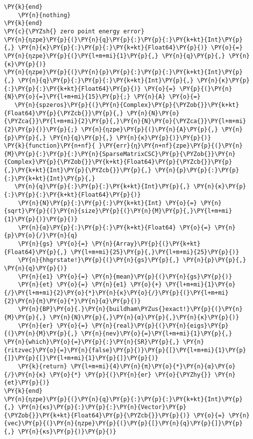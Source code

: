 \begin{Verbatim}[commandchars=\\\{\}]
    \PY{k}{end}
    \PY{n}{nothing}
\PY{k}{end}
\PY{c}{\PYZsh{} zero point energy error}
\PY{n}{ηzpe}\PY{p}{(}\PY{n}{q}\PY{p}{:}\PY{p}{:}\PY{k+kt}{Int}\PY{p}{,} \PY{n}{κ}\PY{p}{:}\PY{p}{:}\PY{k+kt}{Float64}\PY{p}{)} \PY{o}{=} \PY{n}{ηzpe}\PY{p}{(}\PY{l+m+mi}{1}\PY{p}{,} \PY{n}{q}\PY{p}{,} \PY{n}{κ}\PY{p}{)}
\PY{n}{ηzpe}\PY{p}{(}\PY{n}{p}\PY{p}{:}\PY{p}{:}\PY{k+kt}{Int}\PY{p}{,} \PY{n}{q}\PY{p}{:}\PY{p}{:}\PY{k+kt}{Int}\PY{p}{,} \PY{n}{κ}\PY{p}{:}\PY{p}{:}\PY{k+kt}{Float64}\PY{p}{)} \PY{o}{=} \PY{p}{(}\PY{n}{N}\PY{o}{=}\PY{l+m+mi}{15}\PY{p}{;} \PY{n}{A} \PY{o}{=}
   \PY{n}{spzeros}\PY{p}{(}\PY{n}{Complex}\PY{p}{\PYZob{}}\PY{k+kt}{Float64}\PY{p}{\PYZcb{}}\PY{p}{,} \PY{n}{N}\PY{o}{\PYZca{}}\PY{l+m+mi}{2}\PY{p}{,}\PY{n}{N}\PY{o}{\PYZca{}}\PY{l+m+mi}{2}\PY{p}{)}\PY{p}{;} \PY{n}{ηzpe}\PY{p}{(}\PY{n}{A}\PY{p}{,} \PY{n}{p}\PY{p}{,} \PY{n}{q}\PY{p}{,} \PY{n}{κ}\PY{p}{)}\PY{p}{)}
\PY{k}{function}\PY{n+nf}{ }\PY{err}{η}\PY{n+nf}{zpe}\PY{p}{(}\PY{n}{M}\PY{p}{:}\PY{p}{:}\PY{n}{SparseMatrixCSC}\PY{p}{\PYZob{}}\PY{n}{Complex}\PY{p}{\PYZob{}}\PY{k+kt}{Float64}\PY{p}{\PYZcb{}}\PY{p}{,}\PY{k+kt}{Int}\PY{p}{\PYZcb{}}\PY{p}{,} \PY{n}{p}\PY{p}{:}\PY{p}{:}\PY{k+kt}{Int}\PY{p}{,}
   \PY{n}{q}\PY{p}{:}\PY{p}{:}\PY{k+kt}{Int}\PY{p}{,} \PY{n}{κ}\PY{p}{:}\PY{p}{:}\PY{k+kt}{Float64}\PY{p}{)}
    \PY{n}{N}\PY{p}{:}\PY{p}{:}\PY{k+kt}{Int} \PY{o}{=} \PY{n}{sqrt}\PY{p}{(}\PY{n}{size}\PY{p}{(}\PY{n}{M}\PY{p}{,}\PY{l+m+mi}{1}\PY{p}{)}\PY{p}{)}
    \PY{n}{α}\PY{p}{:}\PY{p}{:}\PY{k+kt}{Float64} \PY{o}{=} \PY{n}{p}\PY{o}{/}\PY{n}{q}
    \PY{n}{gs} \PY{o}{=} \PY{n}{Array}\PY{p}{(}\PY{k+kt}{Float64}\PY{p}{,} \PY{l+m+mi}{25}\PY{p}{,}\PY{l+m+mi}{25}\PY{p}{)}
    \PY{n}{hhgrstate!}\PY{p}{(}\PY{n}{gs}\PY{p}{,} \PY{n}{p}\PY{p}{,} \PY{n}{q}\PY{p}{)}
    \PY{n}{e1} \PY{o}{=} \PY{n}{mean}\PY{p}{(}\PY{n}{gs}\PY{p}{)}
    \PY{n}{et} \PY{o}{=} \PY{n}{e1} \PY{o}{+} \PY{l+m+mi}{1}\PY{o}{/}\PY{l+m+mi}{2}\PY{o}{*}\PY{n}{κ}\PY{o}{/}\PY{p}{(}\PY{l+m+mi}{2}\PY{n}{π}\PY{o}{*}\PY{n}{α}\PY{p}{)}
    \PY{n}{BP}\PY{o}{.}\PY{n}{buildham\PYZus{}exact!}\PY{p}{(}\PY{n}{M}\PY{p}{,} \PY{n}{N}\PY{p}{,}\PY{n}{α}\PY{p}{,}\PY{n}{κ}\PY{p}{)}
    \PY{n}{er} \PY{o}{=} \PY{n}{real}\PY{p}{(}\PY{n}{eigs}\PY{p}{(}\PY{n}{M}\PY{p}{,} \PY{n}{nev}\PY{o}{=}\PY{l+m+mi}{1}\PY{p}{,} \PY{n}{which}\PY{o}{=}\PY{p}{:}\PY{n}{SR}\PY{p}{,} \PY{n}{ritzvec}\PY{o}{=}\PY{n}{false}\PY{p}{)}\PY{p}{[}\PY{l+m+mi}{1}\PY{p}{]}\PY{p}{[}\PY{l+m+mi}{1}\PY{p}{]}\PY{p}{)}
    \PY{k}{return} \PY{l+m+mi}{4}\PY{n}{π}\PY{o}{*}\PY{n}{α}\PY{o}{/}\PY{n}{κ} \PY{o}{*} \PY{p}{(}\PY{n}{er} \PY{o}{\PYZhy{}} \PY{n}{et}\PY{p}{)}
\PY{k}{end}
\PY{n}{ηzpe}\PY{p}{(}\PY{n}{q}\PY{p}{:}\PY{p}{:}\PY{k+kt}{Int}\PY{p}{,} \PY{n}{κs}\PY{p}{:}\PY{p}{:}\PY{n}{Vector}\PY{p}{\PYZob{}}\PY{k+kt}{Float64}\PY{p}{\PYZcb{}}\PY{p}{)} \PY{o}{=} \PY{n}{vec}\PY{p}{(}\PY{n}{ηzpe}\PY{p}{(}\PY{p}{[}\PY{n}{q}\PY{p}{]}\PY{p}{,} \PY{n}{κs}\PY{p}{)}\PY{p}{)}

\end{Verbatim}
